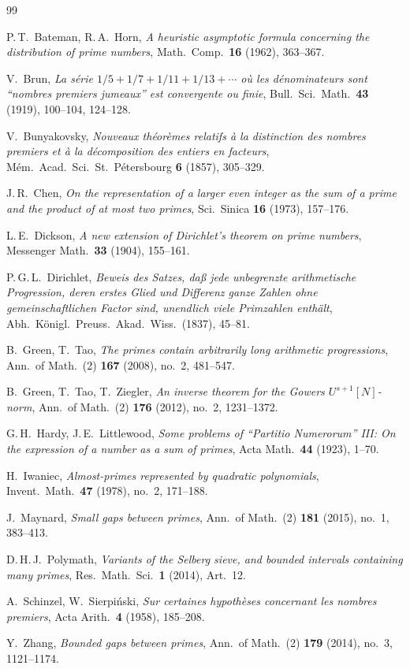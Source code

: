 \documentclass[12pt,a4paper]{amsart}
\theoremstyle{definition}
\theoremstyle{remark}
\begin{document}
\begin{thebibliography}{99}

P.\,T.\ Bateman, R.\,A.\ Horn,
\textit{A heuristic asymptotic formula concerning the distribution of prime numbers},
Math.\ Comp.\ \textbf{16} (1962), 363--367.

V.\ Brun,
\textit{La série $1/5+1/7+1/11+1/13+\cdots$ où les dénominateurs sont ``nombres premiers jumeaux'' est convergente ou finie},
Bull.\ Sci.\ Math.\ \textbf{43} (1919), 100--104, 124--128.

V.\ Bunyakovsky,
\textit{Nouveaux théorèmes relatifs à la distinction des nombres premiers et à la
décomposition des entiers en facteurs},
Mém.\ Acad.\ Sci.\ St.\ Pétersbourg \textbf{6} (1857), 305--329.

J.\,R.\ Chen,
\textit{On the representation of a larger even integer as the sum of a prime and the
product of at most two primes},
Sci.\ Sinica \textbf{16} (1973), 157--176.

L.\,E.\ Dickson,
\textit{A new extension of Dirichlet's theorem on prime numbers},
Messenger Math.\ \textbf{33} (1904), 155--161.

P.\,G.\,L.\ Dirichlet,
\textit{Beweis des Satzes, daß jede unbegrenzte arithmetische Progression, deren erstes
Glied und Differenz ganze Zahlen ohne gemeinschaftlichen Factor sind, unendlich viele
Primzahlen enthält},
Abh.\ Königl.\ Preuss.\ Akad.\ Wiss.\ (1837), 45--81.

B.\ Green, T.\ Tao,
\textit{The primes contain arbitrarily long arithmetic progressions},
Ann.\ of Math.\ (2) \textbf{167} (2008), no.\ 2, 481--547.

B.\ Green, T.\ Tao, T.\ Ziegler,
\textit{An inverse theorem for the Gowers $U^{s+1}[N]$-norm},
Ann.\ of Math.\ (2) \textbf{176} (2012), no.\ 2, 1231--1372.

G.\,H.\ Hardy, J.\,E.\ Littlewood,
\textit{Some problems of ``Partitio Numerorum'' III: On the expression of a number as a
sum of primes},
Acta Math.\ \textbf{44} (1923), 1--70.

H.\ Iwaniec,
\textit{Almost-primes represented by quadratic polynomials},
Invent.\ Math.\ \textbf{47} (1978), no.\ 2, 171--188.

J.\ Maynard,
\textit{Small gaps between primes},
Ann.\ of Math.\ (2) \textbf{181} (2015), no.\ 1, 383--413.

D.\,H.\,J.\ Polymath,
\textit{Variants of the Selberg sieve, and bounded intervals containing many primes},
Res.\ Math.\ Sci.\ \textbf{1} (2014), Art.\ 12.

A.\ Schinzel, W.\ Sierpiński,
\textit{Sur certaines hypothèses concernant les nombres premiers},
Acta Arith.\ \textbf{4} (1958), 185--208.

Y.\ Zhang,
\textit{Bounded gaps between primes},
Ann.\ of Math.\ (2) \textbf{179} (2014), no.\ 3, 1121--1174.

\end{thebibliography}
\end{document}
